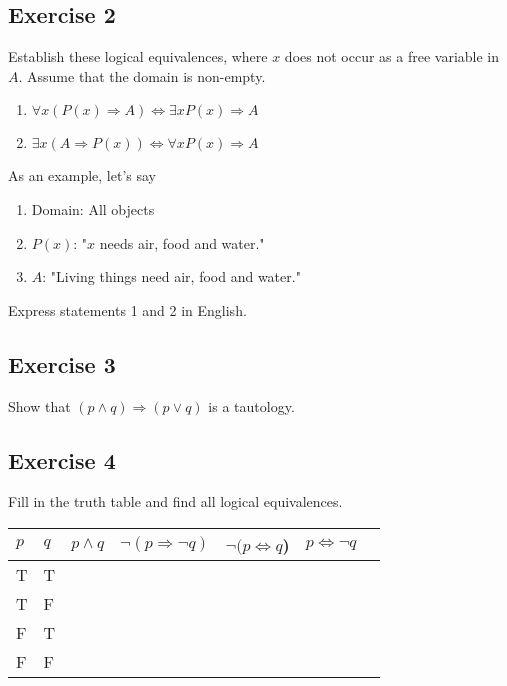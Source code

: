 \documentclass{article}
\begin{document}
\subsection*{Exercise 2}
Establish these logical equivalences, where $x$ does not occur as a free variable in $A$. Assume that the domain is non-empty.
\begin{enumerate}
	\item $\forall x(P(x) \Rightarrow A) \Leftrightarrow \exists xP(x) \Rightarrow A$
	\item $\exists x(A \Rightarrow P(x)) \Leftrightarrow \forall xP(x) \Rightarrow A$
\end{enumerate}
As an example, let's say
\begin{enumerate}
	\item Domain: All objects
	\item $P(x)$: "$x$ needs air, food and water."
	\item $A$: "Living things need air, food and water."
\end{enumerate}
Express statements 1 and 2 in English.
\subsection*{Exercise 3}
Show that $(p \wedge q) \Rightarrow (p \vee q)$ is a tautology.
\subsection*{Exercise 4}
Fill in the truth table and find all logical equivalences.
\begin{center}
	\begin{tabular}[c]{|l|l|l|l|l|l|l|}
		\hline
		$p$ & $q$ & $p \wedge q$ & $\neg (p \Rightarrow \neg q)$ & $\neg (p \Leftrightarrow q$) & $p \Leftrightarrow \neg q$ \\
		\hline
		T   & T   &              &                               &                              &                            \\
		T   & F   &              &                               &                              &                            \\
		F   & T   &              &                               &                              &                            \\
		F   & F   &              &                               &                              &                            \\

		\hline
	\end{tabular}
\end{center}
\end{document}
